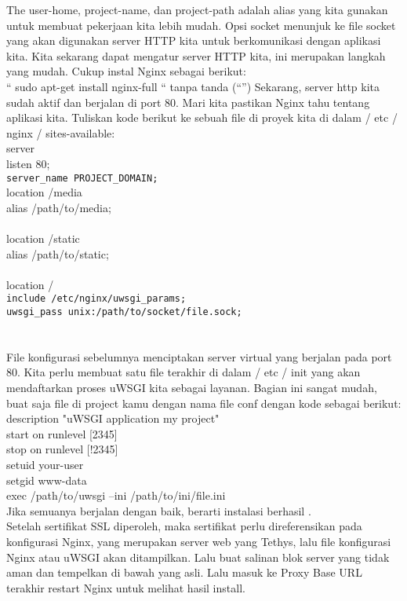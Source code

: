 The user-home, project-name, dan project-path adalah alias yang kita gunakan untuk membuat pekerjaan kita lebih mudah. Opsi socket menunjuk ke file socket yang akan digunakan server HTTP kita untuk berkomunikasi dengan aplikasi kita.
Kita sekarang dapat mengatur server HTTP kita, ini merupakan langkah yang mudah. Cukup instal Nginx sebagai berikut:\\
“ sudo apt-get install nginx-full “ tanpa tanda (“”)
Sekarang, server http kita sudah aktif dan berjalan di port 80. Mari kita pastikan Nginx tahu tentang aplikasi kita. Tuliskan kode berikut ke sebuah file di proyek kita di dalam / etc / nginx / sites-available:\\
server {\\
listen 80;\\
\verb|server_name PROJECT_DOMAIN;|\\
location /media {\\
alias /path/to/media;\\
}\\
location /static {\\
alias /path/to/static;\\
}\\
location / {\\
\verb|include /etc/nginx/uwsgi_params;|\\
\verb|uwsgi_pass unix:/path/to/socket/file.sock;|\\
}\\
}\\
File konfigurasi sebelumnya menciptakan server virtual yang berjalan pada port 80. Kita perlu membuat satu file terakhir di dalam / etc / init yang akan mendaftarkan proses uWSGI kita sebagai layanan. Bagian ini sangat mudah, buat saja file di project kamu dengan nama file conf dengan kode sebagai berikut:\\
description "uWSGI application my project"\\
start on runlevel [2345]\\
stop on runlevel [!2345]\\
setuid your-user\\
setgid www-data\\
exec /path/to/uwsgi --ini /path/to/ini/file.ini\\
Jika semuanya berjalan dengan baik, berarti instalasi berhasil \cite{maia2015building}.\\

Setelah sertifikat SSL diperoleh, maka sertifikat perlu direferensikan pada konfigurasi Nginx, yang merupakan server web yang Tethys, lalu file konfigurasi Nginx atau uWSGI akan ditampilkan. Lalu buat salinan blok server yang tidak aman dan tempelkan di bawah yang asli. Lalu masuk ke Proxy Base URL terakhir restart Nginx untuk melihat hasil install\cite{swain2018tethys}.

